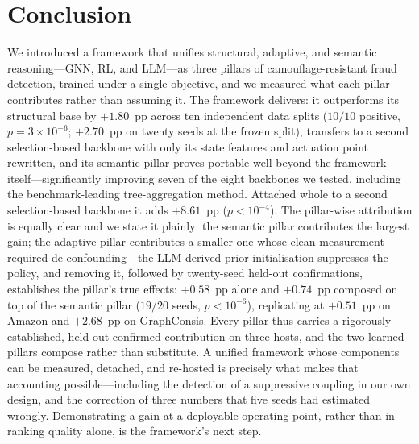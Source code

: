 \documentclass{conf}
\begin{document}
\section{Conclusion}
\label{sec:conclusion}

We introduced a framework that unifies structural, adaptive, and semantic
reasoning---GNN, RL, and LLM---as three pillars of camouflage-resistant fraud
detection, trained under a single objective, and we measured what each pillar
contributes rather than assuming it. The framework delivers: it outperforms its
structural base by $+1.80$~pp across ten independent data splits ($10/10$
positive, $p=3\times10^{-6}$; $+2.70$~pp on twenty seeds at the frozen split),
transfers to a second selection-based backbone with only its state features and
actuation point rewritten, and its semantic pillar proves portable well beyond
the framework itself---significantly improving seven of the eight backbones we
tested, including the benchmark-leading tree-aggregation method. Attached whole
to a second selection-based backbone it adds $+8.61$~pp ($p<10^{-4}$). The
pillar-wise attribution is equally clear and we state it plainly: the semantic
pillar contributes the largest gain; the adaptive pillar contributes a smaller
one whose clean measurement required de-confounding---the LLM-derived prior
initialisation suppresses the policy, and removing it, followed by twenty-seed
held-out confirmations, establishes the pillar's true effects: $+0.58$~pp
alone and $+0.74$~pp composed on top of the semantic pillar ($19/20$ seeds,
$p<10^{-6}$), replicating at $+0.51$~pp on Amazon and $+2.68$~pp on
GraphConsis. Every pillar thus carries a rigorously established,
held-out-confirmed contribution on three hosts, and the two learned pillars
compose rather than substitute. A unified framework whose components can be
measured, detached, and re-hosted is precisely what makes that accounting
possible---including the detection of a suppressive coupling in our own design,
and the correction of three numbers that five seeds had estimated wrongly.
Demonstrating a gain at a deployable operating point, rather than in ranking
quality alone, is the framework's next step.




\end{document}
